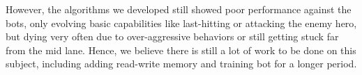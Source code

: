 However, the algorithms we developed still showed poor performance against the bots, only evolving basic capabilities like last-hitting or attacking the enemy hero, but dying very often due to over-aggressive behaviors or still getting stuck far from the mid lane. Hence, we believe there is still a lot of work to be done on this subject, including adding read-write memory and training bot for a longer period.

